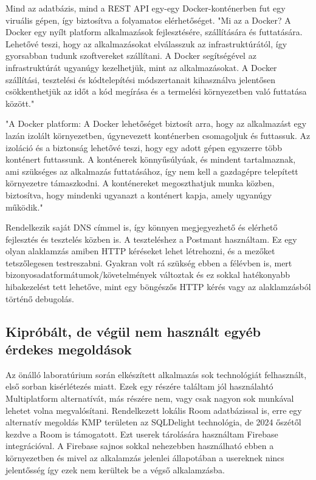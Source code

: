 Mind az adatbázis, mind a REST API egy-egy Docker-konténerben fut egy viruális gépen, így biztosítva a folyamatos elérhetőséget.
"Mi az a Docker? A Docker egy nyílt platform alkalmazások fejlesztésére, szállítására és futtatására. Lehetővé teszi, hogy az alkalmazásokat elválasszuk az infrastruktúrától, így gyorsabban tudunk szoftvereket szállítani. A Docker segítségével az infrastruktúrát ugyanúgy kezelhetjük, mint az alkalmazásokat. A Docker szállítási, tesztelési és kódtelepítési módszertanait kihasználva jelentősen csökkenthetjük az időt a kód megírása és a termelési környezetben való futtatása között." \cite{Docker}

"A Docker platform: A Docker lehetőséget biztosít arra, hogy az alkalmazást egy lazán izolált környezetben, úgynevezett konténerben csomagoljuk és futtassuk. Az izoláció és a biztonság lehetővé teszi, hogy egy adott gépen egyszerre több konténert futtassunk. A konténerek könnyűsúlyúak, és mindent tartalmaznak, ami szükséges az alkalmazás futtatásához, így nem kell a gazdagépre telepített környezetre támaszkodni. A konténereket megoszthatjuk munka közben, biztosítva, hogy mindenki ugyanazt a konténert kapja, amely ugyanúgy működik." \cite{Docker}


Rendelkezik saját DNS címmel is, így könnyen megjegyezhető és elérhető fejlesztés és tesztelés közben is.
A teszteléshez a Postmant használtam. Ez egy olyan alaklamzás amiben HTTP kéréseket lehet létrehozni, és a mezőket tetszőlegesen testreszabni.
Gyakran volt rá szükség ebben a félévben is, mert bizonyosadatformátumok/követelmények változtak és ez sokkal hatékonyabb hibakezelést tett lehetőve, mint egy böngészős HTTP kérés vagy az alaklamzásból történő debugolás.


\subsection{Kipróbált, de végül nem használt egyéb érdekes megoldások}

Az önálló laboratúrium során elkészített alkalmazás sok technológiát felhasznált, első sorban kisérlétezés miatt.
Ezek egy részére találtam jól használahtó Multiplatform alternatívát, más részére nem, vagy csak nagyon sok munkával lehetet volna megvalósítani.
Rendelkezett lokális Room adatbázissal is, erre egy alternatív megoldás KMP területen az SQLDelight technológia, de 2024 őszétől kezdve a Room is támogatott. 
Ezt userek tárolására használtam Firebase integrációval. A Firebase sajnos sokkal nehezebben használható ebben a környezetben és mivel az alkalamzás jelenlei állapotában a usereknek nincs jelentősség így ezek nem kerültek be a végső alkalamzásba.


